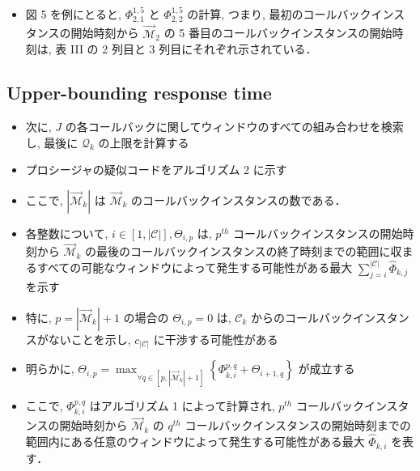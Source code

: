 \begin{frame}{}
    \begin{itemize}
        \item 図 5 を例にとると, $\Phi_{2,1}^{1,5}$ と $\Phi_{2,2}^{1,5}$ の計算, つまり, 最初のコールバックインスタンスの開始時刻から $\overrightarrow{\mathcal{M}}_{2}$ の 5 番目のコールバックインスタンスの開始時刻は, 表 III の 2 列目と 3 列目にそれぞれ示されている．
    \end{itemize}
\end{frame}


\subsection{Upper-bounding response time}
\label{ssec: upper bounding response time}

\begin{frame}{}
    \begin{itemize}
        \item 次に, $J$ の各コールバックに関してウィンドウのすべての組み合わせを検索し, 最後に $\mathcal{Q}_{k}$ の上限を計算する
        \item プロシージャの疑似コードをアルゴリズム 2 に示す
        \item ここで, $\left|\overrightarrow{\mathcal{M}}_{k}\right|$ は $\overrightarrow{\mathcal{M}}_{k}$ のコールバックインスタンスの数である．
    \end{itemize}
\end{frame}

\begin{frame}{}
    \begin{itemize}
        \item 各整数について, $i \in[1,|\mathcal{C}|], \Theta_{i, p}$ は, $p^{t h}$ コールバックインスタンスの開始時刻から $\overrightarrow{\mathcal{M}}_{k}$ の最後のコールバックインスタンスの終了時刻までの範囲に収まるすべての可能なウィンドウによって発生する可能性がある最大 $\sum_{j=i}^{|\mathcal{C}|} \hat{\Phi}_{k, j}$ を示す
        \item 特に, $p=\left|\overrightarrow{\mathcal{M}}_{k}\right|+1$ の場合の $\Theta_{i, p}=0$ は, $\mathcal{C}_{k}$ からのコールバックインスタンスがないことを示し, $c_{|\mathcal{C}|}$ に干渉する可能性がある
        \item 明らかに, $\Theta_{i, p}=\max _{\forall q \in\left[p,\left|\overrightarrow{\mathcal{M}}_{k}\right|+1\right]}\left\{\Phi_{k, i}^{p, q}+\Theta_{i+1, q}\right\}$ が成立する
        \item ここで, $\Phi_{k, i}^{p, q}$ はアルゴリズム 1 によって計算され, $p^{t h}$ コールバックインスタンスの開始時刻から $\overrightarrow{\mathcal{M}}_{k}$ の $q^{t h}$ コールバックインスタンスの開始時刻までの範囲内にある任意のウィンドウによって発生する可能性がある最大 $\hat{\Phi}_{k, i}$ を表す．
    \end{itemize}
\end{frame}

